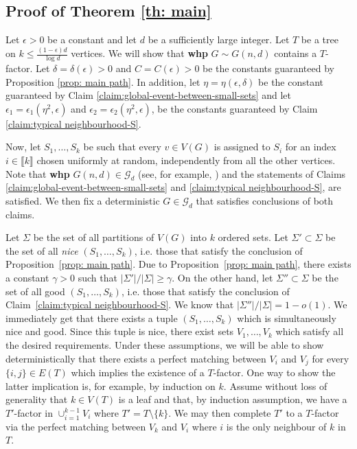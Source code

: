 \documentclass[notitlepage]{scrartcl}
\newcommand{\br}[1]{\llbracket{#1}\rrbracket}
\begin{document}
\subsection{Proof of Theorem \ref{th: main}}\label{subsection:proof-of-main-thm}
Let $\epsilon > 0$ be a constant and let $d$ be a sufficiently large integer. Let $T$ be a tree on $k\le \frac{(1-\epsilon)d}{\log d}$ vertices. We will show that \textbf{whp} $G \sim G(n, d)$ contains a $T$-factor. Let $\delta = \delta(\epsilon) > 0$ and $C = C(\epsilon) > 0$ be the constants guaranteed by Proposition \ref{prop: main path}. In addition, let $\eta = \eta(\epsilon, \delta)$ be the constant guaranteed by Claim \ref{claim:global-event-between-small-sets} and let $\epsilon_1 = \epsilon_1(\eta^2,\epsilon)$ and $\epsilon_2 = \epsilon_2(\eta^2,\epsilon)$, be the constants guaranteed by Claim \ref{claim:typical neighbourhood-S}.

Now, let $S_1,\ldots, S_k$ be such that every $v\in V(G)$ is assigned to $S_i$ for an index $i\in \br{k}$ chosen uniformly at random, independently from all the other vertices. Note that \textbf{whp} $G(n,d)\in \mathcal{G}_d$ (see, for example, \cite{W99}) and the statements of Claims \ref{claim:global-event-between-small-sets} and \ref{claim:typical neighbourhood-S}, are satisfied. We then fix a deterministic $G\in \mathcal{G}_d$ that satisfies conclusions of both claims.

Let $\Sigma$ be the set of all partitions of $V(G)$ into $k$ ordered sets. Let $\Sigma'\subset\Sigma$ be the set of all \emph{nice} $(S_1,\ldots,S_k)$, i.e. those that satisfy the conclusion of Proposition~\ref{prop: main path}. Due to Proposition~\ref{prop: main path}, there exists a constant $\gamma>0$ such that $|\Sigma'|/|\Sigma|\geq\gamma$. On the other hand, let $\Sigma''\subset\Sigma$ be the set of all good $(S_1,\ldots,S_k)$, i.e. those that satisfy the conclusion of Claim~\ref{claim:typical neighbourhood-S}. We know that $|\Sigma''|/|\Sigma|=1-o(1)$. We immediately get that there exists a tuple $(S_1,\ldots,S_k)$ which is simultaneously nice and good. Since this tuple is nice,
there exist sets $V_1, \dots, V_k$ which satisfy all the desired requirements. Under these assumptions, we will be able to show deterministically that there exists a perfect matching between $V_i$ and $V_j$ for every $\{i,j\} \in E(T)$ which implies the existence of a $T$-factor. One way to show the latter implication is, for example, by induction on $k$. Assume without loss of generality that $k \in V(T)$ is a leaf and that, by induction assumption, we have a $T'$-factor in $\cup_{i=1}^{k-1} V_i$ where $T' = T \setminus \{k\}$. We may then complete $T'$ to a $T$-factor via the perfect matching between $V_k$ and $V_i$ where $i$ is the only neighbour of $k$ in $T$.
\end{document}
